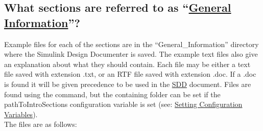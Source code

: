 \documentclass{mcscert}
\newcommand{\sddtool}{Simulink Design Documenter}
\newcommand{\geninfonolink}{General Information}
\newcommand{\geninfo}{\hyperref[def:general-info]{\geninfonolink{}}}
\begin{document}
  \subsection{What sections are referred to as ``\geninfo{}''?}
  \label{ssec:gen-info-secs}
  Example files for each of the sections are in the ``General\_Information'' directory where the \sddtool{} is saved. 
  The example text files also give an explanation about what they should contain. 
  Each file may be either a text file saved with extension .txt, or an RTF file saved with extension .doc. 
  If a .doc is found it will be given precedence to be used in the \hyperref[acr:sdd]{SDD} document. 
  Files are found using the \matlab{}  command, but the containing folder can be set if the pathToIntroSections configuration variable is set (see: \hyperref[ssec:setting-config-vars]{Setting Configuration Variables}).\\
  The files are as follows:
\end{document}

